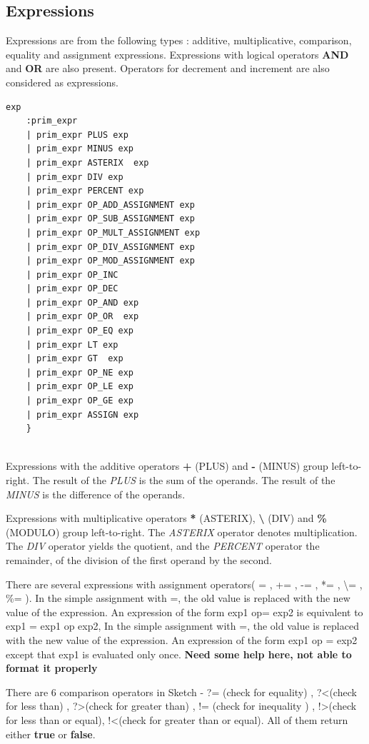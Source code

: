 \documentclass{l3proj}
\begin{document}
\subsection{Expressions}
\label{expr-man}
Expressions are from the following types : additive, multiplicative, comparison, equality and assignment expressions. Expressions with logical operators \textbf{AND} and \textbf{OR} are also present. Operators for decrement and increment are also considered as expressions. 
\begin{lstlisting}
exp
    :prim_expr
    | prim_expr PLUS exp 
    | prim_expr MINUS exp
    | prim_expr ASTERIX  exp
    | prim_expr DIV exp  
    | prim_expr PERCENT exp 
    | prim_expr OP_ADD_ASSIGNMENT exp 
    | prim_expr OP_SUB_ASSIGNMENT exp 
    | prim_expr OP_MULT_ASSIGNMENT exp
    | prim_expr OP_DIV_ASSIGNMENT exp 
    | prim_expr OP_MOD_ASSIGNMENT exp 
    | prim_expr OP_INC  
    | prim_expr OP_DEC  
    | prim_expr OP_AND exp 
    | prim_expr OP_OR  exp 
    | prim_expr OP_EQ exp 
    | prim_expr LT exp 
    | prim_expr GT  exp
    | prim_expr OP_NE exp
    | prim_expr OP_LE exp
    | prim_expr OP_GE exp
    | prim_expr ASSIGN exp     
    }
      
\end{lstlisting}
Expressions with the additive operators \textbf{+} (PLUS) and \textbf{-} (MINUS) group left-to-right. The result of the \textit{PLUS} is the sum of the operands. The result of the \textit{MINUS} is the difference of the operands.

Expressions with multiplicative operators \textbf{*} (ASTERIX), \textbf{\textbackslash } (DIV) and \textbf{\%} (MODULO)  group left-to-right. The \textit{ASTERIX} operator denotes multiplication. The  \textit{DIV} operator yields the quotient, and the \textit{PERCENT} operator the remainder, of the division of the first operand by the second.

There are several expressions with assignment operators( = , += , -= , *= , \textbackslash= , \%= ). In the simple assignment with =, the old value is replaced with the new value of the expression.   An expression of the form exp1 op= exp2 is equivalent to exp1 = exp1 op exp2, In the simple assignment with =, the old value is replaced with the new value of the expression.  An expression of the form exp1 op = exp2 except that exp1 is evaluated only once. \textbf{Need some help here, not able to format it properly}

There are 6 comparison operators in Sketch - ?= (check for equality) , ?\textless (check for less than) , ?\textgreater (check for greater than) , != (check for inequality ) , !\textgreater(check for less than or equal), !\textless (check for greater than or equal). All of them return either \textbf{true} or \textbf{false}. 
\end{document}
